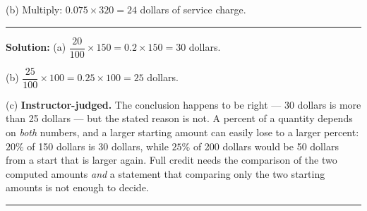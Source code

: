 \documentclass[12pt]{article}
\begin{document}
(b) Multiply: $0.075 \times 320 = 24$ dollars of service
charge. 

\vspace{0.3cm}\noindent\rule{\linewidth}{0.2pt}\vspace{0.3cm}


\textbf{Solution:} (a) $\dfrac{20}{100} \times 150 = 0.2 \times 150 = 30$
dollars. 

(b) $\dfrac{25}{100} \times 100 = 0.25 \times 100 = 25$ dollars. 

(c) \textbf{Instructor-judged.} The conclusion happens to be right --- 30
dollars is more than 25 dollars --- but the stated reason is not. A percent of
a quantity depends on \emph{both} numbers, and a larger starting amount can
easily lose to a larger percent: $20\%$ of 150 dollars is 30 dollars, while
$25\%$ of 200 dollars would be 50 dollars from a start that is larger again.
Full credit needs the comparison of the two computed amounts \emph{and} a
statement that comparing only the two starting amounts is not enough to decide.

\vspace{0.3cm}\noindent\rule{\linewidth}{0.2pt}\vspace{0.3cm}
\end{document}
